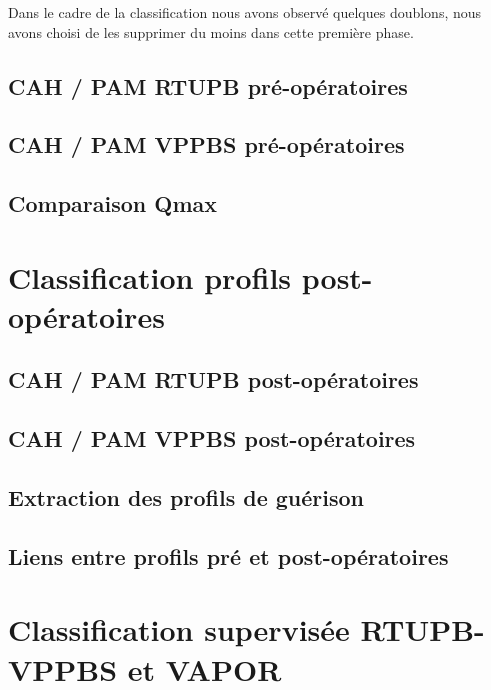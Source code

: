 \documentclass[12pt]{article}
\begin{document}
Dans le cadre de la classification nous avons observé quelques doublons, nous avons choisi de les supprimer 
du moins dans cette première phase. 


\subsection{CAH / PAM RTUPB pré-opératoires }
	  
\subsection{CAH / PAM VPPBS  pré-opératoires }
	  
\subsection{Comparaison Qmax }
	  

%


\section{Classification profils post-opératoires}
\subsection{CAH / PAM RTUPB post-opératoires}
	  
\subsection{CAH / PAM VPPBS post-opératoires}
	  
\subsection{Extraction des profils de guérison}
	  
\subsection{Liens entre profils pré et post-opératoires}
	  

\section{Classification supervisée RTUPB-VPPBS et VAPOR}
\end{document}

